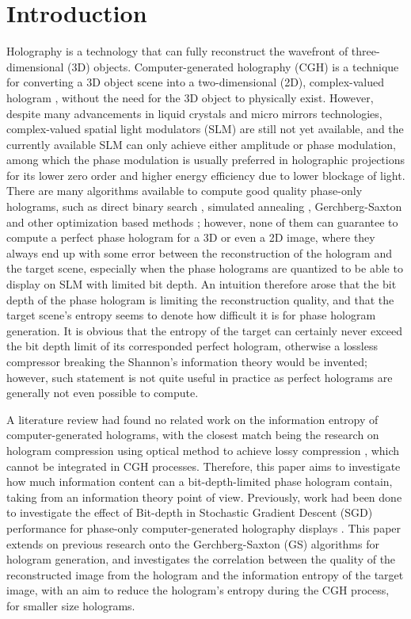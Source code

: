 \section{Introduction}
	Holography is a technology that can fully reconstruct the wavefront of three-dimensional (3D) objects. Computer-generated holography (CGH) is a technique for converting a 3D object scene into a two-dimensional (2D), complex-valued hologram \cite{Tsang2018}, without the need for the 3D object to physically exist. However, despite many advancements in liquid crystals and micro mirrors technologies, complex-valued spatial light modulators (SLM) are still not yet available, and the currently available SLM can only achieve either amplitude or phase modulation, among which the phase modulation is usually preferred in holographic projections for its lower zero order and higher energy efficiency due to lower blockage of light. There are many algorithms available to compute good quality phase-only holograms, such as direct binary search \cite{Seldowitz1987}, simulated annealing \cite{Kirkpatrick1983}, Gerchberg-Saxton \cite{Gerchberg1972} and other optimization based methods \cite{Zhang2017, Liu2020, Choi2021, Chen2021, Kadis2022, Sha2023}; however, none of them can guarantee to compute a perfect phase hologram for a 3D or even a 2D image, where they always end up with some error between the reconstruction of the hologram and the target scene, especially when the phase holograms are quantized to be able to display on SLM with limited bit depth. An intuition therefore arose that the bit depth of the phase hologram is limiting the reconstruction quality, and that the target scene's entropy seems to denote how difficult it is for phase hologram generation. It is obvious that the entropy of the target can certainly never exceed the bit depth limit of its corresponded perfect hologram, otherwise a lossless compressor breaking the Shannon's information theory \cite{Shannon1948} would be invented; however, such statement is not quite useful in practice as perfect holograms are generally not even possible to compute.

	A literature review had found no related work on the information entropy of computer-generated holograms, with the closest match being the research on hologram compression using optical method to achieve lossy compression \cite{Kollin1988}, which cannot be integrated in CGH processes. Therefore, this paper aims to investigate how much information content can a bit-depth-limited phase hologram contain, taking from an information theory point of view. Previously, work had been done to investigate the effect of Bit-depth in Stochastic Gradient Descent (SGD) performance for phase-only computer-generated holography displays \cite{Kadis2022}. This paper extends on previous research onto the Gerchberg-Saxton (GS) \cite{Gerchberg1972} algorithms for hologram generation, and investigates the correlation between the quality of the reconstructed image from the hologram and the information entropy of the target image, with an aim to reduce the hologram's entropy during the CGH process, for smaller size holograms.


